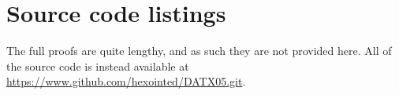 \chapter{Source code listings}
	
	The full proofs are quite lengthy, and as such they are not provided here. 
	All of the source code is instead available at 
	\url{https://www.github.com/hexointed/DATX05.git}.

